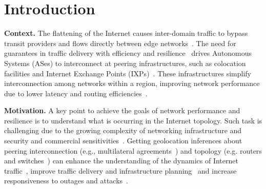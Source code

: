 \chapter{Introduction}\label{cap:introduction}
\thispagestyle{empty}

	\textbf{Context.} The flattening of the Internet causes inter-domain traffic to bypass transit providers and flows directly between edge networks~\cite{Labovitz:2010:IIT:1851182.1851194}. The need for guarantees in traffic delivery with efficiency and resilience~\cite{Yap:2017:TEO:3098822.3098854, Schlinker:2017:EEE:3098822.3098853, marcos:2018:dynamix} drives Autonomous Systems (ASes) to interconnect at peering infrastructures, such as colocation facilities and Internet Exchange Points (IXPs)~\cite{Giotsas:2015:MPI:2716281.2836122}. These infrastructures simplify interconnection among networks within a region, improving network performance due to lower latency and routing efficiencies~\cite{Chatzis:2013}.


	\textbf{Motivation.} A key point to achieve the goals of network performance and resilience is to understand what is occurring in the Internet topology. Such task is challenging due to the growing complexity of networking infrastructure and security and commercial sensitivities~\cite{Giotsas:2015:MPI:2716281.2836122}. Getting geolocation inferences about peering interconnection (e.g., multilateral agreements~\cite{Giotsas:2013}) and topology (e.g. routers and switches~\cite{8002903,Huffaker:2014:DDR:2656877.2656879}) can enhance the understanding of the dynamics of Internet traffic~\cite{marcos:2018:dynamix}, improve traffic delivery and infrastructure planning~\cite{Calder:2013:MEG:2504730.2504754} and increase responsiveness to outages and attacks~\cite{Giotsas:2017:DPI:3098822.3098855}.

